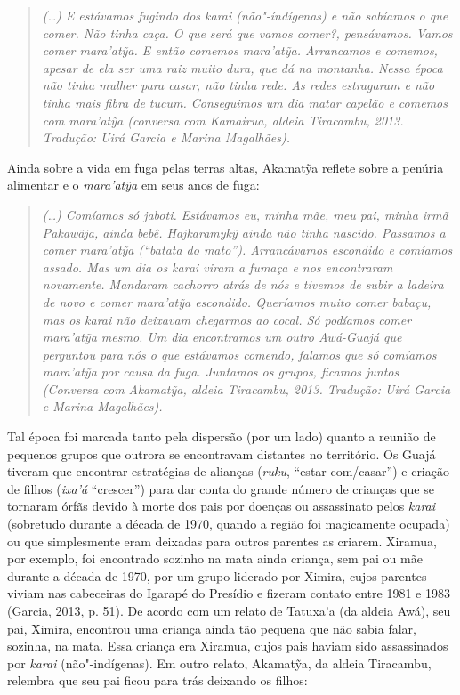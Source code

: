 \begin{quote}
\emph{(\ldots{}) E estávamos fugindo dos karai (não"-índígenas) e não
sabíamos o que comer. Não tinha caça. O que será que vamos comer?,
pensávamos. Vamos comer mara'atỹa. E então comemos mara'atỹa. Arrancamos
e comemos, apesar de ela ser uma raiz muito dura, que dá na montanha.
Nessa época não tinha mulher para casar, não tinha rede. As redes
estragaram e não tinha mais fibra de tucum. Conseguimos um dia matar
capelão e comemos com mara'atỹa (conversa com Kamairua, aldeia
Tiracambu, 2013. Tradução: Uirá Garcia e Marina Magalhães).}
\end{quote}

Ainda sobre a vida em fuga pelas terras altas, Akamatỹa reflete sobre a
penúria alimentar e o \emph{mara'atỹa} em seus anos de fuga:

\begin{quote}
\emph{(\ldots{}) Comíamos só jaboti. Estávamos eu, minha mãe, meu pai,
minha irmã Pakawãja, ainda bebê. Hajkaramykỹ ainda não tinha nascido.
Passamos a comer mara'atỹa (``batata do mato''). Arrancávamos escondido
e comíamos assado. Mas um dia os karai viram a fumaça e nos encontraram
novamente. Mandaram cachorro atrás de nós e tivemos de subir a ladeira
de novo e comer mara'atỹa escondido. Queríamos muito comer babaçu, mas
os karai não deixavam chegarmos ao cocal. Só podíamos comer mara'atỹa
mesmo. Um dia encontramos um outro Awá-Guajá que perguntou para nós o
que estávamos comendo, falamos que só comíamos mara'atỹa por causa da
fuga. Juntamos os grupos, ficamos juntos (Conversa com Akamatỹa,
aldeia Tiracambu, 2013. Tradução: Uirá Garcia e Marina Magalhães).}
\end{quote}

Tal época foi marcada tanto pela dispersão (por um lado) quanto a
reunião de pequenos grupos que outrora se encontravam distantes no
território. Os Guajá tiveram que encontrar estratégias de alianças
(\emph{ruku}, ``estar com/casar'') e criação de filhos (\emph{ixa'á}
``crescer'') para dar conta do grande número de crianças que se tornaram
órfãs devido à morte dos pais por doenças ou assassinato pelos
\emph{karai} (sobretudo durante a década de 1970, quando a região foi
maçicamente ocupada) ou que simplesmente eram deixadas para outros
parentes as criarem. Xiramua, por exemplo, foi encontrado sozinho na
mata ainda criança, sem pai ou mãe durante a década de 1970, por um
grupo liderado por Ximira, cujos parentes viviam nas cabeceiras do
Igarapé do Presídio e fizeram contato entre 1981 e 1983 (Garcia, 2013,
p. 51). De acordo com um relato de Tatuxa'a (da aldeia Awá), seu pai,
Ximira, encontrou uma criança ainda tão pequena que não sabia falar,
sozinha, na mata. Essa criança era Xiramua, cujos pais haviam sido
assassinados por \emph{karai} (não"-indígenas). Em outro relato,
Akamatỹa, da aldeia Tiracambu, relembra que seu pai ficou para trás
deixando os filhos:

